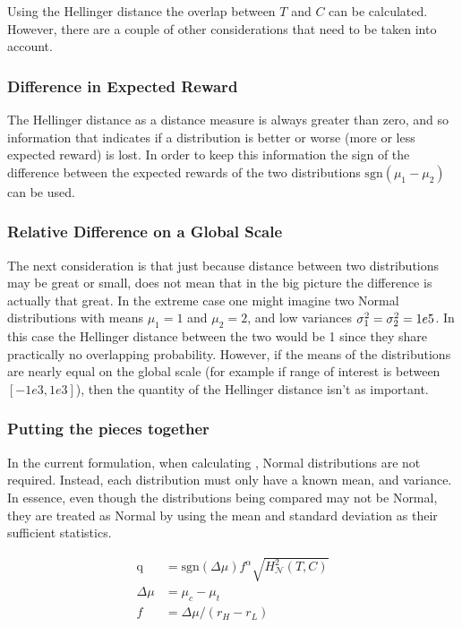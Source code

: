 Using the Hellinger distance the overlap between $T$ and $C$ can be calculated. However, there are a couple of other considerations that need to be taken into account. 

\subsubsection{Difference in Expected Reward}
The Hellinger distance as a distance measure is always greater than zero, and so information that indicates if a distribution is better or worse (more or less expected reward) is lost. In order to keep this information the sign of the difference between the expected rewards of the two distributions $\text{sgn}(\mu_1-\mu_2)$ can be used.

\subsubsection{Relative Difference on a Global Scale}
The next consideration is that just because distance between two distributions may be great or small, does not mean that in the big picture the difference is actually that great. In the extreme case one might imagine two Normal distributions with means $\mu_1=1$ and $\mu_2=2$, and low variances $\sigma_1^2=\sigma_2^2=1e\-5$. In this case the Hellinger distance between the two would be 1 since they share practically no overlapping probability. However, if the means of the distributions are nearly equal on the global scale (for example if range of interest is between $[-1e3,1e3]$), then the quantity of the Hellinger distance isn't as important.

\subsubsection{Putting the pieces together}
In the current formulation, when calculating \xQ, Normal distributions are not required. Instead, each distribution must only have a known mean, and variance. In essence, even though the distributions being compared may not be Normal, they are treated as Normal by using the mean and standard deviation as their sufficient statistics.

\begin{align}
    \text{q} &= \text{sgn}(\Delta \mu)f^{\alpha}\sqrt{H_{\mathcal{N}}^{2}(T,C)} \label{eq:q}\\
    \Delta \mu &= \mu_c-\mu_t\\
    f &= \Delta \mu/(r_H-r_L) \label{eq:f}
\end{align}


